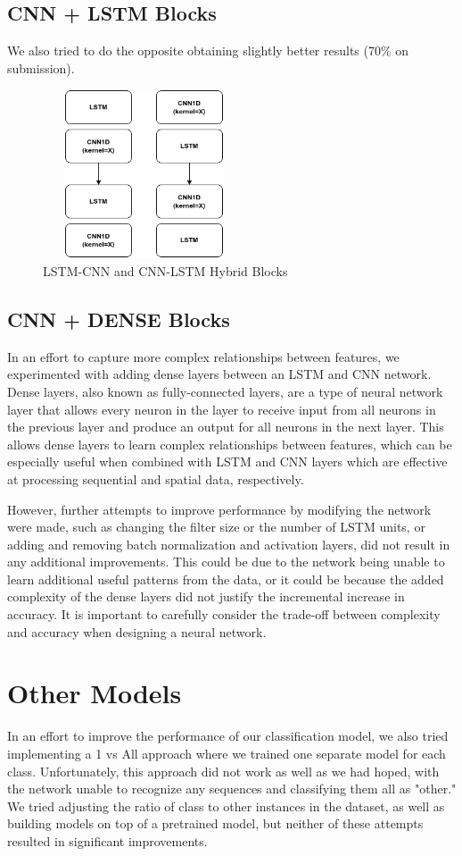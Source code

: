 \documentclass[11pt]{article}
\begin{document}
\subsection{CNN + LSTM Blocks}
We also tried to do the opposite obtaining slightly better results (70\% on submission).
\begin{figure}[h]
  \centering
  \includegraphics[width=6cm, height=5cm]{LSTMCNN}
  \caption{LSTM-CNN and CNN-LSTM Hybrid Blocks}
\end{figure}

\subsection{CNN + DENSE Blocks}
In an effort to capture more complex relationships between features, we experimented with adding dense layers between an LSTM and CNN network.
Dense layers, also known as fully-connected layers, are a type of neural network layer that allows every neuron in the layer to receive input from all neurons in the previous layer and produce an output for all neurons in the next layer.
This allows dense layers to learn complex relationships between features, which can be especially useful when combined with LSTM and CNN layers which are effective at processing sequential and spatial data, respectively.

However, further attempts to improve performance by modifying the network were made, such as changing the filter size or the number of LSTM units, or adding and removing batch normalization and activation layers, did not result in any additional improvements.
This could be due to the network being unable to learn additional useful patterns from the data, or it could be because the added complexity of the dense layers did not justify the incremental increase in accuracy.
It is important to carefully consider the trade-off between complexity and accuracy when designing a neural network.


\section{Other Models}
In an effort to improve the performance of our classification model, we also tried implementing a 1 vs All approach where we trained one separate model for each class.
Unfortunately, this approach did not work as well as we had hoped, with the network unable to recognize any sequences and classifying them all as "other."
We tried adjusting the ratio of class to other instances in the dataset, as well as building models on top of a pretrained model, but neither of these attempts resulted in significant improvements.
\end{document}
